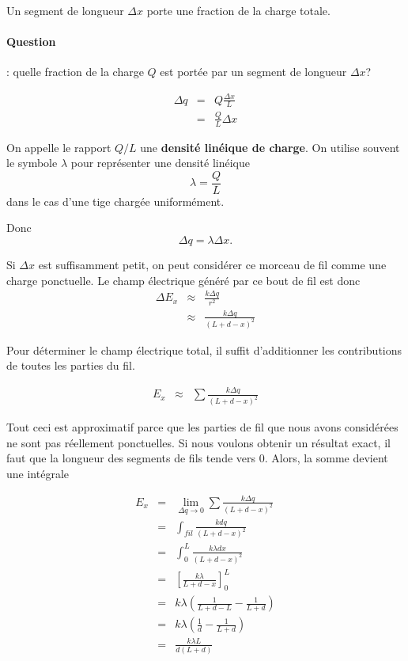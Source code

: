 Un segment de longueur $\Delta x$ porte une fraction de la charge totale.

\paragraph{Question}: quelle fraction de la charge $Q$ est portée par un
segment de longueur $\Delta x$?

\begin{eqnarray*}
\Delta q &=& Q \frac{\Delta x}{L} \\
         &=& \frac{Q}{L} \Delta x
\end{eqnarray*}

On appelle le rapport $Q/L$ une  \textbf{densité linéique de charge}. On
utilise souvent le symbole $\lambda$ pour représenter une densité linéique
$$\lambda = \frac{Q}{L}$$
dans le cas d'une tige chargée uniformément.

Donc
$$\Delta q = \lambda \Delta x.$$

Si $\Delta x$ est suffisamment petit, on peut considérer ce morceau de fil
comme une charge ponctuelle. Le champ électrique généré par ce bout de fil est
donc
\begin{eqnarray*}
\Delta E_x &\approx& \frac{k \Delta q}{r^2} \\
           &\approx& \frac{k \Delta q}{(L + d - x)^2}
\end{eqnarray*}

Pour déterminer le champ électrique total, il suffit d'additionner les
contributions de toutes les parties du fil.

\begin{eqnarray*}
  E_x &\approx& \sum \frac{k \Delta q}{(L + d - x)^2}
\end{eqnarray*}

Tout ceci est approximatif parce que les parties de fil que nous avons
considérées ne sont pas réellement ponctuelles. Si nous voulons obtenir un
résultat exact, il faut que la longueur des segments de fils tende vers $0$.
Alors, la somme devient une intégrale

\begin{eqnarray*}
  E_x &=& \lim_{\Delta q \rightarrow 0}\sum \frac{k \Delta q}{(L + d - x)^2} \\
      &=& \int_{fil} \frac{k dq}{(L + d - x)^2} \\
      &=& \int_0^L \frac{k\lambda dx}{(L + d - x)^2} \\
      &=& \left[ \frac{k\lambda}{L + d - x} \right]_0^L \\
      &=& k\lambda \left( \frac{1}{L + d - L} - \frac{1}{L + d} \right) \\
      &=& k\lambda \left( \frac{1}{d} - \frac{1}{L + d} \right) \\
      &=& \frac{k\lambda L}{d(L+d)}
\end{eqnarray*}

